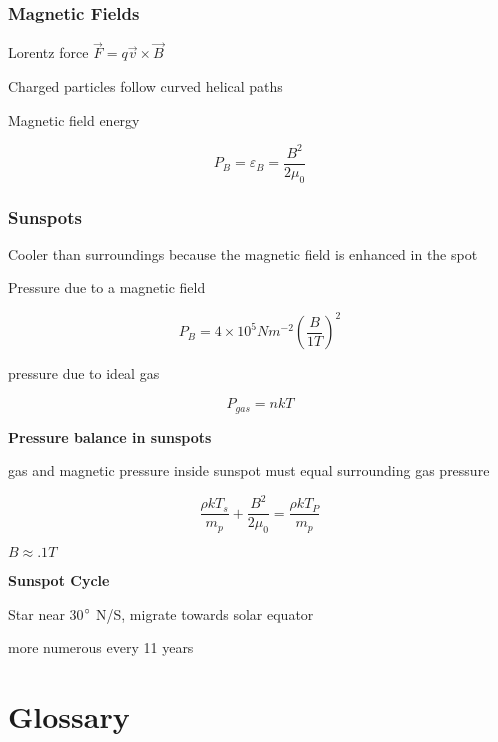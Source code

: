 \documentclass{article}
\begin{document}
\subsubsection{Magnetic Fields}
\begin{list}{-}{}
\item Lorentz force \(\vec{F} = q\vec{v}\times\vec{B}\)
\item Charged particles follow curved helical paths
\item Magnetic field energy
\item \[P_B = \varepsilon_B = \frac{B^2}{2\mu_0}\]
\end{list}

\subsubsection{Sunspots}
\begin{list}{-}{}
\item Cooler than surroundings because the magnetic field is enhanced in the spot
\item Pressure due to a magnetic field
\item \[P_B = 4\times10^5 Nm^{-2} (\frac{B}{1T})^2\]
\item pressure due to ideal gas
\item \[P_{gas} = nkT\]
\end{list}
\noindent \textbf{\large Pressure balance in sunspots}
\begin{list}{-}{}
\item gas and magnetic pressure inside sunspot must equal surrounding gas pressure 
\item \[\frac{\rho kT_s}{m_p} + \frac{B^2}{2\mu_0} = \frac{\rho kT_P}{m_p}\]
\item \(B \approx .1 T\)
\end{list}

\noindent \textbf{\large Sunspot Cycle}
\begin{list}{-}{}
\item Star near 30$\degree$ N/S, migrate towards solar equator 
\item more numerous every 11 years 
\end{list}











\pagebreak
\section{Glossary}
\end{document}
